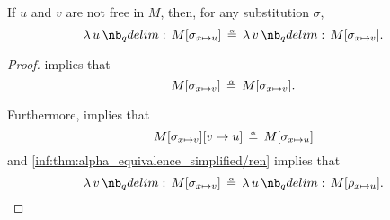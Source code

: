 \begin{corollary}\label{thm:alpha_conversion_modified}
  If \( u \) and \( v \) are not free in \( M \), then, for any substitution \( \sigma \),
  \begin{equation}\label{eq:thm:alpha_conversion_modified}
    \qabs u M[\sigma_{x \mapsto u}] \aequiv \qabs v M[\sigma_{x \mapsto v}].
  \end{equation}
\end{corollary}
\begin{proof}
   implies that
  \begin{equation*}
    M[\sigma_{x \mapsto v}] \aequiv M[\sigma_{x \mapsto v}].
  \end{equation*}


  Furthermore,  implies that
  \begin{equation*}
    M[\sigma_{x \mapsto v}][v \mapsto u] \aequiv M[\sigma_{x \mapsto u}]
  \end{equation*}
  and \ref{inf:thm:alpha_equivalence_simplified/ren} implies that
  \begin{equation*}
    \qabs v M[\sigma_{x \mapsto v}] \aequiv \qabs u M[\rho_{x \mapsto u}].
  \end{equation*}
\end{proof}

